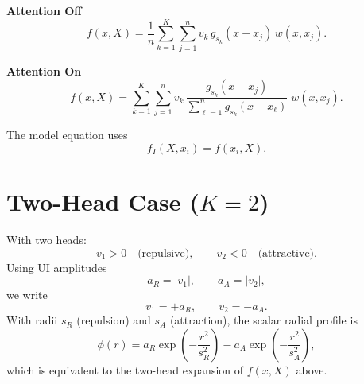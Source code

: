 \documentclass[11pt]{article}
\begin{document}
\textbf{Attention Off}
\[
f(x,X)=
\frac{1}{n}\sum_{k=1}^{K}\sum_{j=1}^{n}
v_k\, g_{s_k}(x-x_j)\,w(x,x_j).
\]

\textbf{Attention On}
\[
f(x,X)=
\sum_{k=1}^{K}\sum_{j=1}^{n}
v_k\,
\frac{g_{s_k}(x-x_j)}{\sum_{\ell=1}^{n} g_{s_k}(x-x_\ell)}
\;w(x,x_j).
\]

The model equation uses
\[
f_I(X,x_i)=f(x_i,X).
\]

\section{Two-Head Case ($K=2$)}
With two heads:
\[
v_1>0 \quad\text{(repulsive)}, \qquad v_2<0 \quad\text{(attractive)}.
\]
Using UI amplitudes
\[
a_R = |v_1|,\qquad a_A = |v_2|,
\]
we write
\[
v_1 = +a_R,\qquad v_2 = -a_A.
\]
With radii $s_R$ (repulsion) and $s_A$ (attraction), the scalar radial profile is
\[
\phi(r)=a_R \exp\!\left(-\frac{r^2}{s_R^2}\right)-a_A \exp\!\left(-\frac{r^2}{s_A^2}\right),
\]
which is equivalent to the two-head expansion of $f(x,X)$ above.
\end{document}
